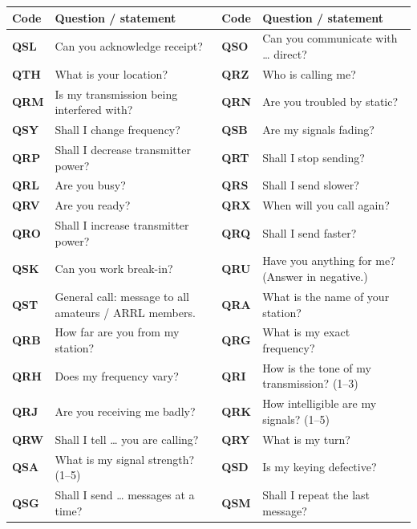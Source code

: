 \documentclass[11pt,letterpaper]{article}
\begin{document}
{\fontsize{10}{12.1}\selectfont
{}
\begin{tabularx}{\linewidth}{|Y{0.35}|Y{1.65}|Y{0.35}|Y{1.65}|}
\hline
{}
\textbf{Code} & \textbf{Question / statement} & \textbf{Code} & \textbf{Question / statement} \\ \hline
\textbf{QSL} & Can you acknowledge receipt? & \textbf{QSO} & Can you communicate with \ldots{} direct? \\ \hline
\textbf{QTH} & What is your location? & \textbf{QRZ} & Who is calling me? \\ \hline
\textbf{QRM} & Is my transmission being interfered with? & \textbf{QRN} & Are you troubled by static? \\ \hline
\textbf{QSY} & Shall I change frequency? & \textbf{QSB} & Are my signals fading? \\ \hline
\textbf{QRP} & Shall I decrease transmitter power? & \textbf{QRT} & Shall I stop sending? \\ \hline
\textbf{QRL} & Are you busy? & \textbf{QRS} & Shall I send slower? \\ \hline
\textbf{QRV} & Are you ready? & \textbf{QRX} & When will you call again? \\ \hline
\textbf{QRO} & Shall I increase transmitter power? & \textbf{QRQ} & Shall I send faster? \\ \hline
\textbf{QSK} & Can you work break-in? & \textbf{QRU} & Have you anything for me? (Answer in negative.) \\ \hline
\textbf{QST} & General call: message to all amateurs / ARRL members. & \textbf{QRA} & What is the name of your station? \\ \hline
\textbf{QRB} & How far are you from my station? & \textbf{QRG} & What is my exact frequency? \\ \hline
\textbf{QRH} & Does my frequency vary? & \textbf{QRI} & How is the tone of my transmission? (1--3) \\ \hline
\textbf{QRJ} & Are you receiving me badly? & \textbf{QRK} & How intelligible are my signals? (1--5) \\ \hline
\textbf{QRW} & Shall I tell \ldots{} you are calling? & \textbf{QRY} & What is my turn? \\ \hline
\textbf{QSA} & What is my signal strength? (1--5) & \textbf{QSD} & Is my keying defective? \\ \hline
\textbf{QSG} & Shall I send \ldots{} messages at a time? & \textbf{QSM} & Shall I repeat the last message? \\ \hline

\end{tabularx}}
\end{document}
